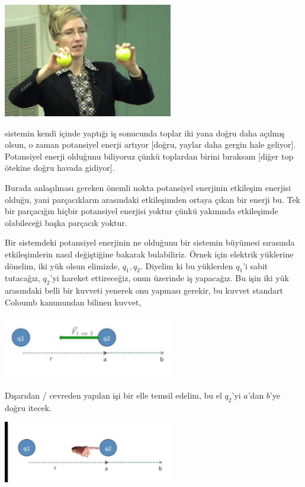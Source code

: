 \documentclass[12pt,fleqn]{article}\usepackage{../../common}
\begin{document}
\includegraphics[width=20em]{08_02.jpg}
 
sistemin kendi içinde yaptığı iş sonucunda toplar iki yana doğru daha açılmış
olsun, o zaman potansiyel enerji artıyor [doğru, yaylar daha gergin hale
  geliyor]. Potansiyel enerji olduğunu biliyoruz çünkü toplardan birini bıraksam
[diğer top ötekine doğru havada gidiyor]. 

Burada anlaşılması gereken önemli nokta potansiyel enerjinin etkileşim enerjisi
olduğu, yani parçacıkların arasındaki etkileşimden ortaya çıkan bir enerji
bu. Tek bir parçacığın hiçbir potansiyel enerjisi yoktur çünkü yakınında
etkileşimde olabileceği başka parçacık yoktur.

Bir sistemdeki potansiyel enerjinin ne olduğunu bir sistemin büyümesi sırasında
etkileşimlerin nasıl değiştiğine bakarak bulabiliriz. Örnek için elektrik
yüklerine dönelim, iki yük olsun elimizde, $q_1,q_2$. Diyelim ki bu yüklerden
$q_1$'i sabit tutacağız, $q_2$'yi hareket ettireceğiz, onun üzerinde iş
yapacağız. Bu işin iki yük arasındaki belli bir kuvveti yenerek onu yapması
gerekir, bu kuvvet standart Coloumb kanunundan bilinen kuvvet, 

\includegraphics[width=20em]{08_03.jpg}

Dışarıdan / cevreden yapılan işi bir elle temsil edelim, bu el $q_2$'yi $a$'dan
$b$'ye doğru itecek.

\includegraphics[width=20em]{08_04.jpg}
\end{document}
